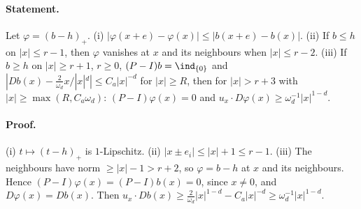 \paragraph{Statement.} Let $\varphi=(b-h)_+$. (i) $|\varphi(x+e)-\varphi(x)|\leq|b(x+e)-b(x)|$. (ii) If $b\leq h$ on $|x|\leq r-1$, then
$\varphi$ vanishes at $x$ and its neighbours when $|x|\leq r-2$. (iii) If $b\geq h$ on $|x|\geq r+1$, $r\geq0$, $(P-I)b=\ind_{\{0\}}$
and $|Db(x)-\frac2{\omega_d}x/|x|^d|\leq C_a|x|^{-d}$ for $|x|\geq R$, then for $|x|>r+3$ with $|x|\geq\max(R,C_a\omega_d)$:
$(P-I)\varphi(x)=0$ and $u_x\cdot D\varphi(x)\geq\omega_d^{-1}|x|^{1-d}$.
\paragraph{Proof.} (i) $t\mapsto(t-h)_+$ is $1$-Lipschitz. (ii) $|x\pm e_i|\leq|x|+1\leq r-1$. (iii) The neighbours have norm
$\geq|x|-1>r+2$, so $\varphi=b-h$ at $x$ and its neighbours. Hence $(P-I)\varphi(x)=(P-I)b(x)=0$, since $x\neq0$, and
$D\varphi(x)=Db(x)$. Then $u_x\cdot Db(x)\geq\frac2{\omega_d}|x|^{1-d}-C_a|x|^{-d}\geq\omega_d^{-1}|x|^{1-d}$.
